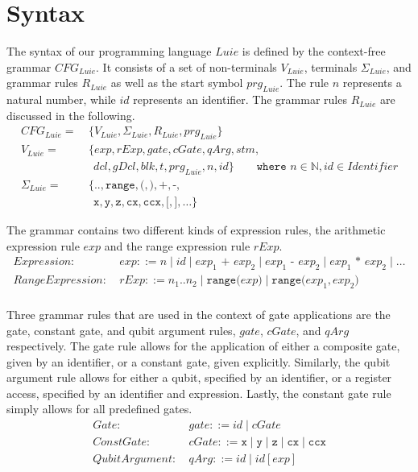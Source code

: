 \section{Syntax}
\label{sec:concept_abstractGrammar}
The syntax of our programming language $Luie$ is defined by the context-free grammar $CFG_{Luie}$. It consists of a set of non-terminals $V_{Luie}$, terminals $\Sigma_{Luie}$, and grammar rules $R_{Luie}$ as well as the start symbol $prg_{Luie}$. The rule $n$ represents a natural number, while $id$ represents an identifier. The grammar rules $R_{Luie}$ are discussed in the following.
\begin{align*}
    CFG_{Luie} = \ & \{V_{Luie}, \Sigma_{Luie}, R_{Luie}, prg_{Luie} \}\\ 
    V_{Luie} = \ & \{ exp, rExp, gate, cGate, qArg, stm,\\ 
            & \ \  dcl, gDcl, blk, t, prg_{Luie}, n, id \} \quad \quad \texttt{where } n \in \mathbb{N}, id \in Identifier\\ 
    \Sigma_{Luie} = \ & \{\texttt{..}, \texttt{range}, \texttt{(}, \texttt{)}, \texttt{+}, \texttt{-}, \\
               & \ \ \texttt{x}, \texttt{y}, \texttt{z}, \texttt{cx}, \texttt{ccx}, \texttt{[}, \texttt{]}, \dots \} 
\end{align*}

The grammar contains two different kinds of expression rules, the arithmetic expression rule $exp$ and the range expression rule $rExp$.
\begin{align*}
    Expression: \ & exp ::= n \mid id \mid exp_1 \texttt{ + } exp_2 \mid exp_1 \texttt{ - } exp_2 \mid exp_1 \texttt{ * } exp_2 \mid \dots\\
    RangeExpression: \ & rExp ::= n_1 .. n_2 \mid \texttt{range(} exp \texttt{)} \mid \texttt{range(} exp_1, exp_2 \texttt{)}\\
\end{align*}

Three grammar rules that are used in the context of gate applications are the gate, constant gate, and qubit argument rules, $gate$, $cGate$, and $qArg$ respectively. The gate rule allows for the application of either a composite gate, given by an identifier, or a constant gate, given explicitly. Similarly, the qubit argument rule allows for either a qubit, specified by an identifier, or a register access, specified by an identifier and expression. Lastly, the constant gate rule simply allows for all predefined gates. 
\begin{align*}
    Gate: \ & gate ::= id \mid cGate\\
    ConstGate: \ & cGate ::= \texttt{x} \mid \texttt{y} \mid \texttt{z} \mid \texttt{cx} \mid \texttt{ccx}\\
    QubitArgument: \ & qArg ::= id \mid id[exp]
\end{align*}

